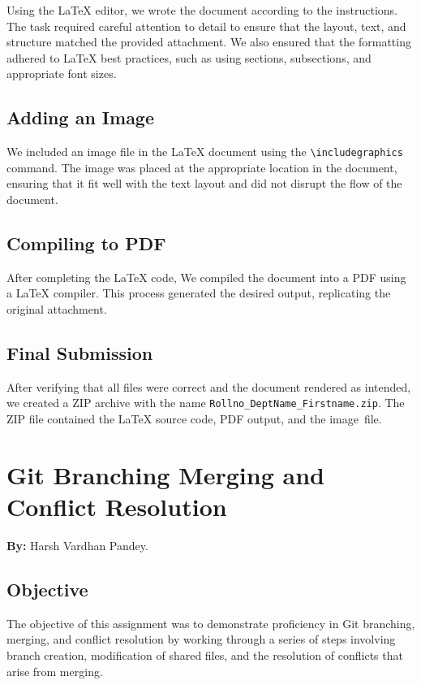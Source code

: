 \documentclass[a4paper,12pt]{article}
\begin{document}
Using the LaTeX editor, we wrote the document according to the instructions. The task required careful attention to detail to ensure that the layout, text, and structure matched the provided attachment. We also ensured that the formatting adhered to LaTeX best practices, such as using sections, subsections, and appropriate font sizes.

\subsection{Adding an Image}

We included an image file in the LaTeX document using the \texttt{\textbackslash includegraphics} command. The image was placed at the appropriate location in the document, ensuring that it fit well with the text layout and did not disrupt the flow of the document.

\subsection{Compiling to PDF}

After completing the LaTeX code, We compiled the document into a PDF using a LaTeX compiler. This process generated the desired output, replicating the original attachment.



\subsection{Final Submission}

After verifying that all files were correct and the document rendered as intended, we created a ZIP archive with the name \texttt{Rollno\_DeptName\_Firstname.zip}. The ZIP file contained the LaTeX source code, PDF output, and the image file.

\newpage

\section{Git Branching Merging and Conflict Resolution}
\textbf{By:} Harsh Vardhan Pandey.

\subsection{Objective}
The objective of this assignment was to demonstrate proficiency in Git branching, merging, and conflict resolution by working through a series of steps involving branch creation, modification of shared files, and the resolution of conflicts that arise from merging.
\end{document}
